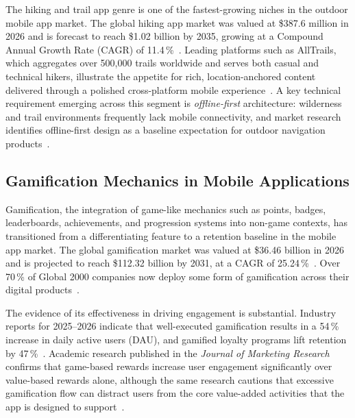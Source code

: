 \documentclass[11pt,a4paper]{article}
\begin{document}
The hiking and trail app genre is one of the fastest-growing niches in the outdoor mobile app market.
The global hiking app market was valued at \$387.6 million in 2026 and is forecast to reach \$1.02 billion by 2035, growing at a Compound Annual Growth Rate (CAGR) of 11.4\,\%~\cite{markwide2026hiking}.
Leading platforms such as AllTrails, which aggregates over 500,000 trails worldwide and serves both casual and technical hikers, illustrate the appetite for rich, location-anchored content delivered through a polished cross-platform mobile experience~\cite{alltrails2026}.
A key technical requirement emerging across this segment is \textit{offline-first} architecture: wilderness and trail environments frequently lack mobile connectivity, and market research identifies offline-first design as a baseline expectation for outdoor navigation products~\cite{markwide2026hiking}.
 

\subsection{Gamification Mechanics in Mobile Applications}
\label{sub:sota:gamification}
 
Gamification, the integration of game-like mechanics such as points, badges, leaderboards, achievements, and progression systems into non-game contexts, has transitioned from a differentiating feature to a retention baseline in the mobile app market.
The global gamification market was valued at \$36.46 billion in 2026 and is projected to reach \$112.32 billion by 2031, at a CAGR of 25.24\,\%~\cite{startus2026gamification}.
Over 70\,\% of Global 2000 companies now deploy some form of gamification across their digital products~\cite{visu2026gamification}.
 
The evidence of its effectiveness in driving engagement is substantial.
Industry reports for 2025--2026 indicate that well-executed gamification results in a 54\,\% increase in daily active users (DAU), and gamified loyalty programs lift retention by 47\,\%~\cite{strivecloud2026gamification}.
Academic research published in the \textit{Journal of Marketing Research} confirms that game-based rewards increase user engagement significantly over value-based rewards alone, although the same research cautions that excessive gamification flow can distract users from the core value-added activities that the app is designed to support~\cite{ama2025gamification}.
 
\end{document}

